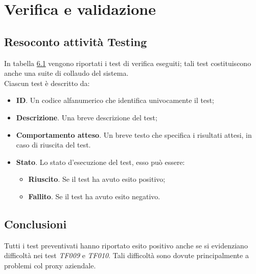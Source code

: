 
\pagestyle{IHA-fancy-style}
\chapter{Verifica e validazione}
\label{cap:verifica-validazione}


\section{Resoconto attività Testing}

In tabella \hyperref[tab:test]{6.1} vengono riportati i test di verifica eseguiti; tali test costituiscono anche una suite di collaudo del sistema. \\

Ciascun test è descritto da:

\begin{itemize}
    \item \textbf{ID}. Un codice alfanumerico che identifica univocamente il test;
    \item \textbf{Descrizione}. Una breve descrizione del test;
    \item \textbf{Comportamento atteso}. Un breve testo che specifica i risultati attesi, in caso di riuscita del test.
    \item \textbf{Stato}. Lo stato d'esecuzione del test, esso può essere:
    \begin{itemize}
        \item \textbf{Riuscito}. Se il test ha avuto esito positivo;
        \item \textbf{Fallito}. Se il test ha avuto esito negativo.
    \end{itemize}
\end{itemize}



\section{Conclusioni}

Tutti i test preventivati hanno riportato esito positivo anche se si evidenziano difficoltà nei test \textit{TF009} e \textit{TF010}. Tali difficoltà sono dovute principalmente a problemi col proxy aziendale.